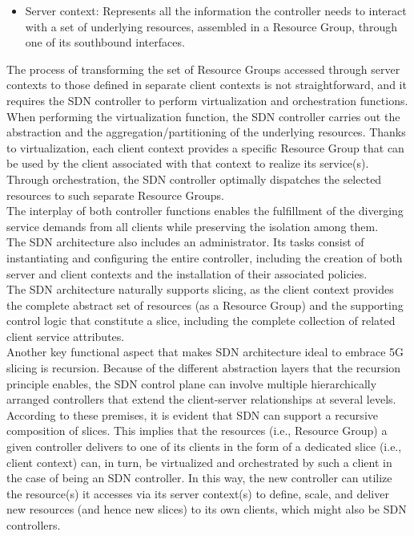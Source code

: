 \documentclass[a4paper,12pt]{report} %
\begin{document}
\begin{itemize}
\item Server context: Represents all the information the controller needs to interact with a set of
underlying resources, assembled in a Resource
Group, through one of its southbound interfaces.
\end{itemize}
The process of transforming the set of
Resource Groups accessed through server contexts to those defined in separate client contexts
is not straightforward, and it requires the SDN
controller to perform virtualization and orchestration functions.\\
When performing the virtualization function, the
SDN controller carries out the abstraction and the
aggregation/partitioning of the underlying resources. Thanks to virtualization, each client context provides a specific Resource Group that can be used by the client associated with that context to realize
its service(s). Through orchestration, the SDN controller optimally dispatches the selected resources
to such separate Resource Groups. \\
The interplay of both controller functions enables the fulfillment
of the diverging service demands from all clients
while preserving the isolation among them.\\
The SDN architecture also includes an administrator. Its tasks consist of instantiating and configuring the entire controller, including the creation
of both server and client contexts and the installation of their associated policies.\\
The SDN architecture naturally supports slicing, as the client context provides the complete abstract set of resources
(as a Resource Group) and the supporting control
logic that constitute a slice, including the complete
collection of related client service attributes.\\
Another key functional aspect that makes SDN
architecture ideal to embrace 5G slicing is recursion. Because of the different abstraction layers
that the recursion principle enables, the SDN
control plane can involve multiple hierarchically
arranged controllers that extend the client-server
relationships at several levels. According to
these premises, it is evident that SDN can support a
recursive composition of slices. This implies that
the resources (i.e., Resource Group) a given controller delivers to one of its clients in the form of a
dedicated slice (i.e., client context) can, in turn, be
virtualized and orchestrated by such a client in the
case of being an SDN controller. In this way, the new
controller can utilize the resource(s) it accesses via
its server context(s) to define, scale, and deliver
new resources (and hence new slices) to its own
clients, which might also be SDN controllers.
\end{document}
